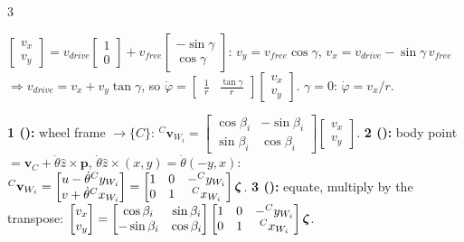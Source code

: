 \begin{multicols}{3}
\begin{deriv}
$\begin{bmatrix}v_x\\v_y\end{bmatrix}=v_{drive}\begin{bmatrix}1\\0\end{bmatrix}+v_{free}\begin{bmatrix}-\sin\gamma\\\cos\gamma\end{bmatrix}$: $v_y=v_{free}\cos\gamma$, $v_x=v_{drive}-\sin\gamma\,v_{free}$ $\Rightarrow v_{drive}=v_x+v_y\tan\gamma$, so $\dot\varphi=\begin{bmatrix}\frac1r&\frac{\tan\gamma}r\end{bmatrix}\begin{bmatrix}v_x\\v_y\end{bmatrix}$. $\gamma=0$: $\dot\varphi=v_x/r$.
\end{deriv}
\begin{deriv}
\textbf{1 ():} wheel frame $\to\{C\}$: ${}^C\mathbf v_{W_i}=\begin{bmatrix}\cos\beta_i&-\sin\beta_i\\\sin\beta_i&\cos\beta_i\end{bmatrix}\begin{bmatrix}v_x\\v_y\end{bmatrix}$.
\textbf{2 ():} body point $=\mathbf v_C+\dot\theta\hat z\times\mathbf p$, $\dot\theta\hat z\times(x,y)=\dot\theta(-y,x)$: ${}^C\mathbf v_{W_i}=\begin{bmatrix}u-\dot\theta{}^{C}y_{W_{i}}\\v+\dot\theta{}^{C}x_{W_{i}}\end{bmatrix}=\begin{bmatrix}1&0&-{}^{C}y_{W_{i}}\\0&1&{}^{C}x_{W_{i}}\end{bmatrix}\boldsymbol\zeta$.
\textbf{3 ():} equate, multiply by the transpose: $\begin{bmatrix}v_x\\v_y\end{bmatrix}=\begin{bmatrix}\cos\beta_i&\sin\beta_i\\-\sin\beta_i&\cos\beta_i\end{bmatrix}\begin{bmatrix}1&0&-{}^{C}y_{W_{i}}\\0&1&{}^{C}x_{W_{i}}\end{bmatrix}\boldsymbol\zeta$.

\end{deriv}
\end{multicols}
